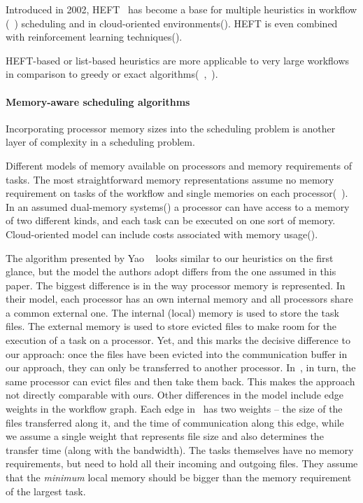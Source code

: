 \documentclass[conference]{IEEEtran}
\begin{document}
    Introduced in 2002, HEFT~\cite{topcuoglu2002performance} has become a base for multiple heuristics in workflow (~\cite{SHI2006665, SANDOKJI2019482}) scheduling
    and in cloud-oriented environments(\cite{samadi2018eheft}).
    HEFT is even combined with reinforcement learning techniques(\cite{yano2022cqga}).

    HEFT-based or list-based heuristics are more applicable to very large workflows in comparison to greedy
    or exact algorithms(~\cite{de2012provenance},~\cite{rahman2013}).


    \paragraph{Memory-aware scheduling algorithms}
    Incorporating processor memory sizes into the scheduling problem is another layer of complexity in a scheduling problem.

    Different models of memory available on processors and memory requirements of tasks.
    The most straightforward memory representations assume no memory requirement on tasks of the workflow and single
    memories on each processor(\eg~\cite{rodriguez2019exploration}).
    In an assumed dual-memory systems(\cite{herrmann2014memory}) a processor can have access to a memory of two different kinds,
    and each task can be executed on one sort of memory.
    Cloud-oriented model can include costs associated with memory usage(\cite{liang2020memory}).


    The algorithm presented by Yao \etal~\cite{yao2022memory} looks similar to our heuristics on the first glance, but the
    model the authors adopt differs from the one assumed in this paper.
    The biggest difference is in the way processor memory is represented.
    In their model, each processor has an own internal memory and all processors share a common external one.
    The internal (local) memory is used to store the task files.
    The external memory is used to store evicted files to make room for the execution of a task on a processor.
    Yet, and this marks the decisive difference to our approach: once the files have been evicted into the communication
    buffer in our approach, they can only be transferred to another processor.
    In~\cite{yao2022memory}, in turn, the same processor can evict files and then take them back.
    This makes the approach not directly comparable with ours.
    Other differences in the model include edge weights in the workflow graph.
    Each edge in~\cite{yao2022memory} has two weights -- the size of the files transferred along it,
    and the time of communication along this edge, while we assume a single weight that represents file size and also
    determines the transfer time (along with the bandwidth).
    The tasks themselves have no memory requirements, but need to hold all their incoming and outgoing files.
    They assume that the {\em minimum} local memory should be bigger than the memory requirement of the largest task.
\end{document}
